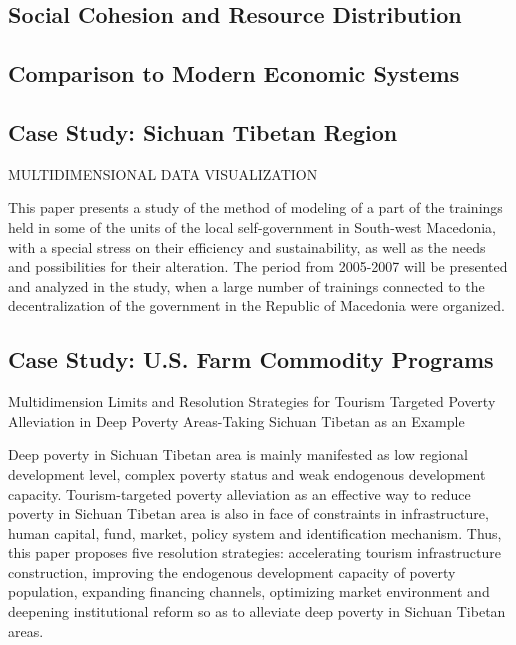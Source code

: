 \documentclass{article}
\begin{document}
\subsection{Social Cohesion and Resource Distribution}

\subsection{Comparison to Modern Economic Systems}

\subsection{Case Study: Sichuan Tibetan Region}

\cite{2004MULTIDIMENSIONALDV} MULTIDIMENSIONAL DATA VISUALIZATION

This paper presents a study of the method of modeling of a part of the trainings held in some of the units of the local self-government in South-west Macedonia, with a special stress on their efficiency and sustainability, as well as the needs and possibilities for their alteration. The period from 2005-2007 will be presented and analyzed in the study, when a large number of trainings connected to the decentralization of the government in the Republic of Macedonia were organized.

\subsection{Case Study: U.S. Farm Commodity Programs}

\cite{Li2018MultidimensionLA} Multidimension Limits and Resolution Strategies for Tourism Targeted Poverty Alleviation in Deep Poverty Areas-Taking Sichuan Tibetan as an Example

Deep poverty in Sichuan Tibetan area is mainly manifested as low regional development level, complex poverty status and weak endogenous development capacity. Tourism-targeted poverty alleviation as an effective way to reduce poverty in Sichuan Tibetan area is also in face of constraints in infrastructure, human capital, fund, market, policy system and identification mechanism. Thus, this paper proposes five resolution strategies: accelerating tourism infrastructure construction, improving the endogenous development capacity of poverty population, expanding financing channels, optimizing market environment and deepening institutional reform so as to alleviate deep poverty in Sichuan Tibetan areas.
\end{document}
